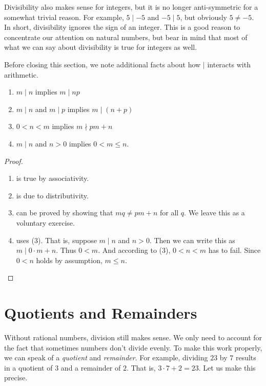 Divisibility also makes sense for integers, but it is no longer anti-symmetric for a somewhat trivial reason.
For example, $5\mid -5$ and $-5\mid 5$, but obviously $5\neq -5$. In short, divisibility ignores the sign of an integer.
This is a good reason to concentrate our attention on natural numbers, but bear in mind that most of what we can say about divisibility is true for integers as well.

Before closing this section, we note additional facts about how $\mid$ interacts with arithmetic.

\begin{prop}
  \begin{enumerate}
    \item $m\mid n$ implies $m\mid np$
    \item $m\mid n$ and $m\mid p$ implies $m\mid (n+p)$
    \item $0<n<m$ implies $m\nmid pm+n$
    \item $m\mid n$ and $n>0$ implies $0< m\leq n$.
  \end{enumerate}

  \begin{proof}
  	\begin{enumerate}
    \item is true by associativity.
    \item is due to distributivity.
    \item can be proved by showing that $mq\neq pm + n$ for all $q$.
    We leave this as a voluntary exercise.
    \item uses (3). That is, suppose $m\mid n$ and $n>0$. 
    Then we can write this as $m \mid 0\cdot m + n$. Thus $0<m$.
    And according to (3), $0<n<m$ has to fail.
    Since $0<n$ holds by assumption, $m\leq n$.
    \end{enumerate}
  \end{proof}
\end{prop}

\section{Quotients and Remainders}

Without rational numbers, division still makes sense. 
We only need to account for the fact that sometimes numbers don't divide evenly.
To make this work properly, we can speak of a \emph{quotient} and \emph{remainder}. 
For example, dividing $23$ by $7$ results in a quotient of $3$ and a remainder of $2$. 
That is, $3\cdot 7 + 2 = 23$. 
Let us make this precise.

